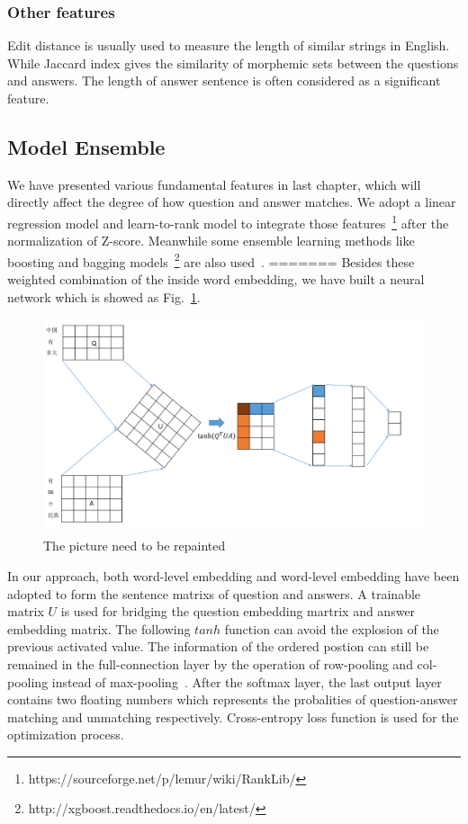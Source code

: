 \documentclass{llncs}
\begin{document}
\begin{table}[!htbp]
\begin{table}[!htbp]
\subsubsection{Other features}
Edit distance is usually used to measure the length of similar strings in English. While Jaccard index gives the similarity of morphemic sets between the questions and answers. The length of answer sentence is often considered as a significant feature.




\subsection{Model Ensemble}
\label{sec:model}
We have presented various fundamental features in last chapter, which will directly affect the degree of how question and answer matches. We adopt a linear regression model and learn-to-rank model \cite{Liu2009Learning} to integrate those features~\footnote{https://sourceforge.net/p/lemur/wiki/RankLib/} after the normalization of Z-score. Meanwhile some ensemble learning methods like boosting and bagging models~\footnote{http://xgboost.readthedocs.io/en/latest/} are also used~\cite{Chen2016XGBoost}. 
=======
Besides these weighted combination of the inside word embedding, we have built a neural network which is showed as Fig.~\ref{fig:model}. 

\begin{figure}
\centering
\includegraphics[width=12cm]{figures/nn.pdf}
\caption{ The picture need to be repainted}
\label{fig:model}
\end{figure}
In our approach, both word-level embedding and word-level embedding have been adopted to form the sentence matrixs of question and answers. A trainable matrix $U$ is used for bridging the question embedding martrix and answer embedding matrix. The following $tanh$ function can avoid the explosion of the previous activated value. The information of the ordered postion can still be remained in the full-connection layer by the operation of row-pooling and col-pooling instead of max-pooling~\cite{Santos2016Attentive}. After the softmax layer, the last output layer contains two floating numbers which represents the probalities of question-answer matching and unmatching respectively. Cross-entropy loss function is used for the optimization process.





\end{table}
\end{table}
\end{document}

